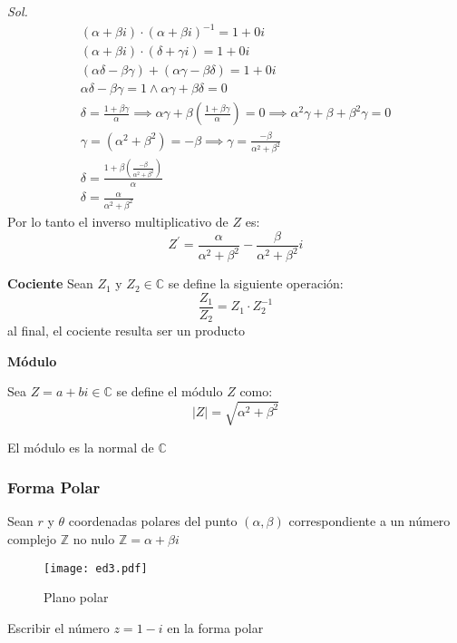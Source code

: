 \textit{ Sol. }
\begin{align*}
    \left(\alpha +\beta i\right) \cdot\left(\alpha +\beta i\right)^{ - 1} = 1 + 0i\\ 
    \left(\alpha +\beta i\right) \cdot \left(\delta +\gamma i\right) = 1+ 0i\\
    \left(\alpha\delta -\beta\gamma\right) +\left(\alpha\gamma-\beta\delta \right) = 1 + 0i\\ 
    \alpha\delta -\beta\gamma = 1\land \alpha\gamma +\beta\delta = 0\\
    \delta = \frac{1 +\beta\gamma}{\alpha}\implies \alpha\gamma +\beta \left(\frac{1 +\beta\gamma}{\alpha}\right) = 0\implies \alpha^2\gamma +\beta +\beta^2\gamma = 0\\
    \gamma = \left(\alpha^2 +\beta^2\right) =-\beta\implies \gamma = \frac{ -\beta}{\alpha^2 +\beta^2}\\
    \delta = \frac{1 +\beta\left(\frac{ -\beta}{\alpha^2 +\beta^2}\right)}{\alpha}\\
    \delta = \frac{\alpha}{\alpha^2 +\beta^2}
\end{align*}
Por lo tanto el inverso multiplicativo de $Z$ es:
\begin{equation}
    Z^{\prime} = \frac{\alpha}{\alpha^2 +\beta^2} -\frac{\beta}{\alpha^2 +\beta^2}i
\end{equation}

\textbf{Cociente}
Sean $Z_1$ y $Z_2\in \mathbb{C} $ se define la siguiente operación:
\begin{equation}
    \frac{Z_1}{Z_2} = Z_1\cdot Z_2^{ - 1}
\end{equation}
al final, el cociente resulta ser un producto

\textbf{Módulo}

Sea $Z=a+bi\in \mathbb{C}$ se define el módulo $Z$ como:
\begin{equation}
    \left\lvert Z\right\rvert = \sqrt{\alpha^2 +\beta^2}
\end{equation}

El módulo es la normal de $\mathbb{C}$

\subsubsection{Forma Polar}

Sean $r$ y $\theta$ coordenadas polares del punto $\left(\alpha, \beta \right)$
correspondiente a un número complejo $\mathbb{Z}$ no nulo $\mathbb{Z}=\alpha+\beta i$

\begin{figure}[h!]
\centering
  \texttt{[image: ed3.pdf]}
  \caption{Plano polar}
  \label{ed3}
\end{figure}
\begin{example}
    Escribir el número $z=1-i$ en la forma polar
\end{example}

